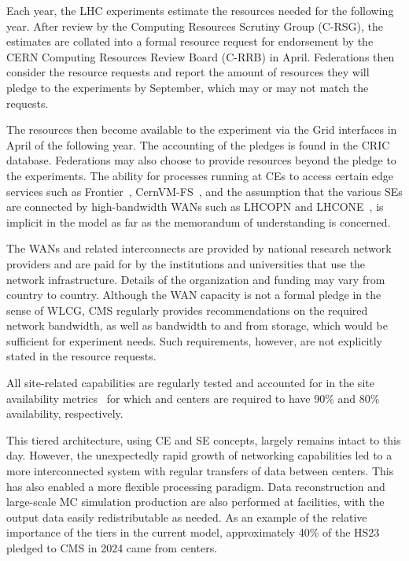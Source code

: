 Each year, the LHC experiments estimate the resources needed for the following year. After review by the Computing Resources Scrutiny Group (C-RSG), the estimates are collated into a formal resource request for endorsement by the CERN Computing Resources Review Board (C-RRB) in April. Federations then consider the resource requests and report the amount of resources they will pledge to the experiments by September, which may or may not match the requests. 

The resources then become available to the experiment via the Grid interfaces in April of the following year. The accounting of the pledges is found in the CRIC~\cite{WLCG-CRIC} database. Federations may also choose to provide resources beyond the pledge to the experiments. The ability for processes running at \glspl{CE} to access certain edge services such as Frontier~\cite{Dykstra:2011zz}, \gls{CernVM-FS}~\cite{Dykstra:2020jjo,Promberger:2024uhv}, and the assumption that the various \glspl{SE} are connected by high-bandwidth \glspl{WAN} such as \gls{LHCOPN} and \gls{LHCONE}~\cite{Martelli_2015,Martelli:2024rha}, is implicit in the model as far as the memorandum of understanding is concerned. 

The WANs and related interconnects are provided by national research network providers and are paid for by the institutions and universities that use the network infrastructure. Details of the organization and funding may vary from country to country. Although the \gls{WAN} capacity is not a formal pledge in the sense of \gls{WLCG}, CMS regularly provides recommendations on the required network bandwidth, as well as bandwidth to and from storage, which would be sufficient for experiment needs. Such requirements, however, are not explicitly stated in the resource requests. 

All site-related capabilities are regularly tested and accounted for in the site availability metrics~\cite{WLCG-availability} for which \TierOne and \TierTwo centers are required to have 90\% and 80\% availability, respectively.

This tiered architecture, using \gls{CE} and \gls{SE} concepts, largely remains intact to this day. However, the unexpectedly rapid growth of networking capabilities led to a more interconnected system with regular transfers of data between \TierTwo centers. This has also enabled a more flexible processing paradigm. Data reconstruction and large-scale \gls{MC} simulation production are also performed at \TierTwo facilities, with the output data easily redistributable as needed. As an example of the relative importance of the tiers in the current model, approximately 40\% of the HS23 pledged to CMS in 2024 came from \TierTwo centers.

